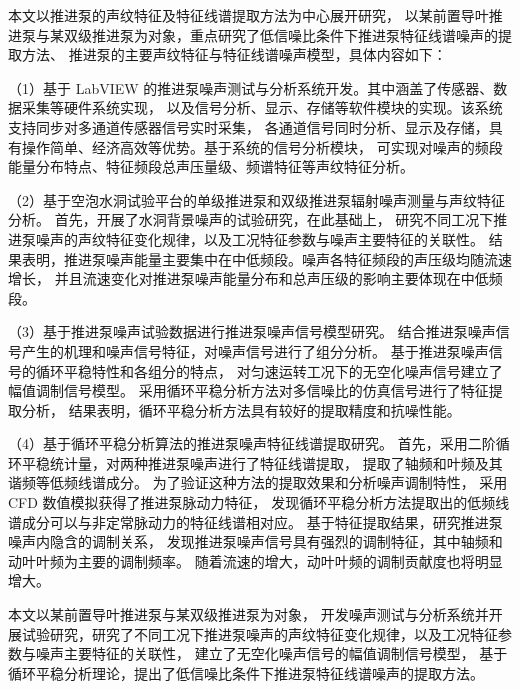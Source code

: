 本文以推进泵的声纹特征及特征线谱提取方法为中心展开研究，
以某前置导叶推进泵与某双级推进泵为对象，重点研究了低信噪比条件下推进泵特征线谱噪声的提取方法、
推进泵的主要声纹特征与特征线谱噪声模型，具体内容如下：

（1）基于 LabVIEW 的推进泵噪声测试与分析系统开发。其中涵盖了传感器、数据采集等硬件系统实现，
以及信号分析、显示、存储等软件模块的实现。该系统支持同步对多通道传感器信号实时采集，
各通道信号同时分析、显示及存储，具有操作简单、经济高效等优势。基于系统的信号分析模块，
可实现对噪声的频段能量分布特点、特征频段总声压量级、频谱特征等声纹特征分析。

（2）基于空泡水洞试验平台的单级推进泵和双级推进泵辐射噪声测量与声纹特征分析。
首先，开展了水洞背景噪声的试验研究，在此基础上，
研究不同工况下推进泵噪声的声纹特征变化规律，以及工况特征参数与噪声主要特征的关联性。
结果表明，推进泵噪声能量主要集中在中低频段。噪声各特征频段的声压级均随流速增长，
并且流速变化对推进泵噪声能量分布和总声压级的影响主要体现在中低频段。

（3）基于推进泵噪声试验数据进行推进泵噪声信号模型研究。
结合推进泵噪声信号产生的机理和噪声信号特征，对噪声信号进行了组分分析。
基于推进泵噪声信号的循环平稳特性和各组分的特点，
对匀速运转工况下的无空化噪声信号建立了幅值调制信号模型。
采用循环平稳分析方法对多信噪比的仿真信号进行了特征提取分析，
结果表明，循环平稳分析方法具有较好的提取精度和抗噪性能。

（4）基于循环平稳分析算法的推进泵噪声特征线谱提取研究。
首先，采用二阶循环平稳统计量，对两种推进泵噪声进行了特征线谱提取，
提取了轴频和叶频及其谐频等低频线谱成分。
为了验证这种方法的提取效果和分析噪声调制特性，
采用 CFD 数值模拟获得了推进泵脉动力特征，
发现循环平稳分析方法提取出的低频线谱成分可以与非定常脉动力的特征线谱相对应。
基于特征提取结果，研究推进泵噪声内隐含的调制关系，
发现推进泵噪声信号具有强烈的调制特征，其中轴频和动叶叶频为主要的调制频率。
随着流速的增大，动叶叶频的调制贡献度也将明显增大。

本文以某前置导叶推进泵与某双级推进泵为对象，
开发噪声测试与分析系统并开展试验研究，研究了不同工况下推进泵噪声的声纹特征变化规律，以及工况特征参数与噪声主要特征的关联性，
建立了无空化噪声信号的幅值调制信号模型，
基于循环平稳分析理论，提出了低信噪比条件下推进泵特征线谱噪声的提取方法。

\quad

